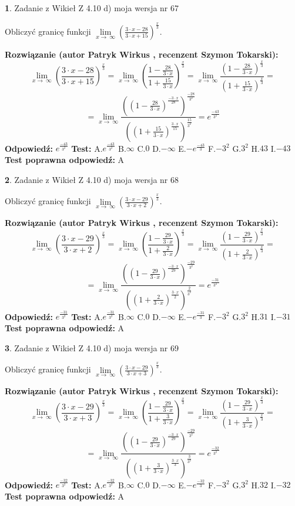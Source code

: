 \documentclass[12pt, a4paper]{article}
\theoremstyle{definition} %
\newtheorem{zad}{}
\newcommand{\zadStart}[1]{\begin{zad}#1\newline}
\newcommand{\zadStop}{\end{zad}}
\newcommand{\rozwStart}[2]{\noindent \textbf{Rozwiązanie (autor #1 , recenzent #2): }\newline}
\newcommand{\rozwStop}{\newline}
\newcommand{\odpStart}{\noindent \textbf{Odpowiedź:}\newline}
\newcommand{\odpStop}{\newline}
\newcommand{\testStart}{\noindent \textbf{Test:}\newline}
\newcommand{\testStop}{\newline}
\newcommand{\kluczStart}{\noindent \textbf{Test poprawna odpowiedź:}\newline}
\newcommand{\kluczStop}{\newline}
\begin{document}
\zadStart{Zadanie z Wikieł Z 4.10 d) moja wersja nr 67}


Obliczyć granicę funkcji  $\lim\limits_{x\to\ \infty}(\frac{3\cdot x-28}{3\cdot x+15})^{\frac{x}{3}}$.
\zadStop
\rozwStart{Patryk Wirkus}{Szymon Tokarski}
$$\lim\limits_{x\to\ \infty}(\frac{3\cdot x-28}{3\cdot x+15})^{\frac{x}{3}} = \lim\limits_{x\to\ \infty}(\frac{1-\frac{28}{3\cdot x}}{1+\frac{15}{3\cdot x}})^{\frac{x}{3}}=\lim\limits_{x\to\ \infty}\frac{(1-\frac{28}{3\cdot x})^{\frac{x}{3}}}{(1+\frac{15}{3\cdot x})^{\frac{x}{3}}}=$$
$$=\lim\limits_{x\to\ \infty}\frac{((1-\frac{28}{3\cdot x})^{\frac{-3\cdot x}{28}})^{\frac{-28}{3^{2}}}}{((1+\frac{15}{3\cdot x})^{\frac{3\cdot x}{15}})^{\frac{15}{3^{2}}}}=e^{\frac{-43}{3^{2}}}$$
\rozwStop
\odpStart
$e^{\frac{-43}{3^{2}}}$
\odpStop
\testStart
A.$e^{\frac{-43}{3^{2}}}$ B.$\infty$ C.$0$ D.$-\infty$ E.$-e^{\frac{-43}{3}}$
F.$-3^{2}$ G.$3^{2}$
H.$43$
I.$-43$
\testStop
\kluczStart
A
\kluczStop



\zadStart{Zadanie z Wikieł Z 4.10 d) moja wersja nr 68}


Obliczyć granicę funkcji  $\lim\limits_{x\to\ \infty}(\frac{3\cdot x-29}{3\cdot x+2})^{\frac{x}{3}}$.
\zadStop
\rozwStart{Patryk Wirkus}{Szymon Tokarski}
$$\lim\limits_{x\to\ \infty}(\frac{3\cdot x-29}{3\cdot x+2})^{\frac{x}{3}} = \lim\limits_{x\to\ \infty}(\frac{1-\frac{29}{3\cdot x}}{1+\frac{2}{3\cdot x}})^{\frac{x}{3}}=\lim\limits_{x\to\ \infty}\frac{(1-\frac{29}{3\cdot x})^{\frac{x}{3}}}{(1+\frac{2}{3\cdot x})^{\frac{x}{3}}}=$$
$$=\lim\limits_{x\to\ \infty}\frac{((1-\frac{29}{3\cdot x})^{\frac{-3\cdot x}{29}})^{\frac{-29}{3^{2}}}}{((1+\frac{2}{3\cdot x})^{\frac{3\cdot x}{2}})^{\frac{2}{3^{2}}}}=e^{\frac{-31}{3^{2}}}$$
\rozwStop
\odpStart
$e^{\frac{-31}{3^{2}}}$
\odpStop
\testStart
A.$e^{\frac{-31}{3^{2}}}$ B.$\infty$ C.$0$ D.$-\infty$ E.$-e^{\frac{-31}{3}}$
F.$-3^{2}$ G.$3^{2}$
H.$31$
I.$-31$
\testStop
\kluczStart
A
\kluczStop



\zadStart{Zadanie z Wikieł Z 4.10 d) moja wersja nr 69}


Obliczyć granicę funkcji  $\lim\limits_{x\to\ \infty}(\frac{3\cdot x-29}{3\cdot x+3})^{\frac{x}{3}}$.
\zadStop
\rozwStart{Patryk Wirkus}{Szymon Tokarski}
$$\lim\limits_{x\to\ \infty}(\frac{3\cdot x-29}{3\cdot x+3})^{\frac{x}{3}} = \lim\limits_{x\to\ \infty}(\frac{1-\frac{29}{3\cdot x}}{1+\frac{3}{3\cdot x}})^{\frac{x}{3}}=\lim\limits_{x\to\ \infty}\frac{(1-\frac{29}{3\cdot x})^{\frac{x}{3}}}{(1+\frac{3}{3\cdot x})^{\frac{x}{3}}}=$$
$$=\lim\limits_{x\to\ \infty}\frac{((1-\frac{29}{3\cdot x})^{\frac{-3\cdot x}{29}})^{\frac{-29}{3^{2}}}}{((1+\frac{3}{3\cdot x})^{\frac{3\cdot x}{3}})^{\frac{3}{3^{2}}}}=e^{\frac{-32}{3^{2}}}$$
\rozwStop
\odpStart
$e^{\frac{-32}{3^{2}}}$
\odpStop
\testStart
A.$e^{\frac{-32}{3^{2}}}$ B.$\infty$ C.$0$ D.$-\infty$ E.$-e^{\frac{-32}{3}}$
F.$-3^{2}$ G.$3^{2}$
H.$32$
I.$-32$
\testStop
\kluczStart
A
\kluczStop
\end{document}
